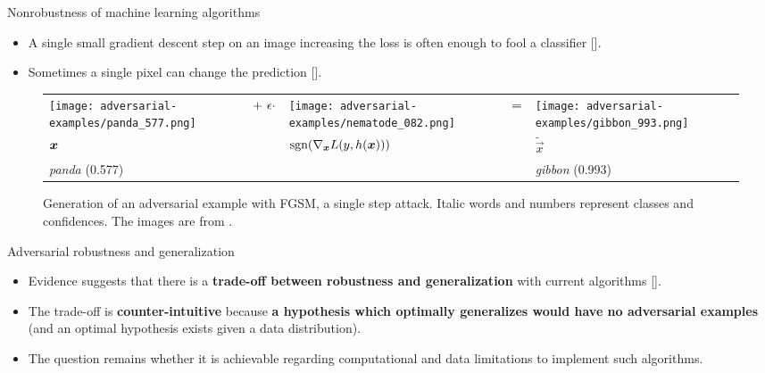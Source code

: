 \documentclass{beamer}
\newcommand{\citet}[1]{{\color{citecolor}\relscale{0.8}\textcite{#1}}}
\newcommand{\citep}[1]{{\color{citecolor}\relscale{0.8}[\textcite{#1}]}}
\begin{document}
\begin{frame}[allowframebreaks=0.9]{Nonrobustness of machine learning algorithms}
	\begin{itemize}
		\item A single small gradient descent step on an image increasing the loss is often enough to fool a classifier \citep{Goodfellow:2014:EHAE}.
		\item Sometimes a single pixel can change the prediction \citep{Su:2017:OPAFDNN}.
	\end{itemize}
	\begin{figure}
	\centering
	{\scriptsize
		\begin{tabular}{>{\centering\arraybackslash}m{}m{.1in}>{\centering\arraybackslash}m{}m{.05in}>{\centering\arraybackslash}m{}}
			\centering\arraybackslash
			\texttt{[image: adversarial-examples/panda\_577.png]} &%
			\centering\arraybackslash%
			$\centering +\ \epsilon \cdot$ &%
			\texttt{[image: adversarial-examples/nematode\_082.png]} &%
			$\centering =$ & %
			\texttt{[image: adversarial-examples/gibbon\_993.png]} \\
			$\centering \vec x$     &%
			& $\sgn\del{\nabla_{\vec x} L(y,h(\vec x))}$ & & $\tilde{\vec x}$ \\
			\emph{panda} (0.577) & & & & \emph{gibbon} (0.993) 
		\end{tabular}
	}
	\caption{Generation of an adversarial example with FGSM, a single step attack. Italic words and numbers represent classes and confidences. The images are from \citet{Goodfellow:2014:EHAE}.}
	\label{fig:fgsm-adversarial-example}
	\end{figure}
\end{frame}

\begin{frame}{Adversarial robustness and generalization}
	\begin{itemize}
		\item Evidence suggests that there is a \textbf{trade-off between robustness and generalization} with current algorithms \citep{Tsipras:2018:RMBOA,Madry:2017:TDLMRAA,Su:2018:IRTCOACSRDICM}.
		\item The trade-off is \textbf{counter-intuitive} because \textbf{a hypothesis which optimally generalizes would have no adversarial examples} (and an optimal hypothesis exists given a data distribution).
		\item The question remains whether it is achievable regarding computational and data limitations to implement such algorithms.
	\end{itemize}
\end{frame}
\end{document}
